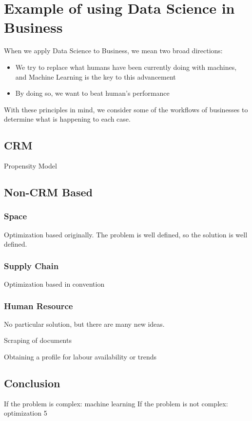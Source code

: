\section{Example of using Data Science in Business}

When we apply Data Science to Business, we mean two broad directions:

\begin{itemize}
\item We try to replace what humans have been currently doing with machines, and Machine Learning is the key to this advancement
\item By doing so, we want to beat human's performance
\end{itemize}

With these principles in mind, we consider some of the workflows of businesses to determine what is happening to each case.  

\subsection{CRM}

Propensity Model 

\subsection{Non-CRM Based}

\subsubsection{Space}

Optimization based originally.  The problem is well defined, so the solution is well defined.  

\subsubsection{Supply Chain}

Optimization based in convention

\subsubsection{Human Resource}

No particular solution, but there are many new ideas.  

Scraping of documents

Obtaining a profile for labour availability or trends




\subsection{Conclusion}

If the problem is complex: machine learning
If the problem is not complex: optimization  5

\newpage